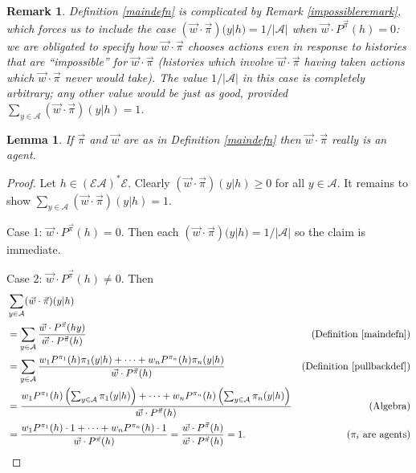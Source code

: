 \documentclass[twoside]{article}
\newtheorem{remark}[theorem]{Remark}
\newtheorem{lemma}[theorem]{Lemma}
\begin{document}
\begin{remark}
    Definition \ref{maindefn} is complicated by Remark \ref{impossibleremark},
    which forces us to include the case
    $(\vec w\cdot\vec\pi)(y|h)=1/|\mathcal A|$ when
    $\vec w\cdot {P^{\vec\pi}}(h)=0$: we are obligated to specify how
    $\vec w\cdot\vec\pi$ chooses actions even in response to histories that
    are ``impossible'' for $\vec w\cdot\vec\pi$ (histories which involve
    $\vec w\cdot\vec\pi$ having taken actions which $\vec w\cdot\vec\pi$
    never would take). The value $1/|\mathcal A|$ in this case is completely arbitrary;
    any other value would be just as good,
    provided $\sum_{y\in\mathcal A}(\vec w\cdot\vec\pi)(y|h)=1$.
\end{remark}

\begin{lemma}
    If $\vec\pi$ and $\vec w$ are as in Definition \ref{maindefn}
    then $\vec w\cdot\vec\pi$ really is an agent.
\end{lemma}

\begin{proof}
    Let $h\in(\mathcal E\mathcal A)^*\mathcal E$.
    Clearly $(\vec w\cdot\vec\pi)(y|h)\geq 0$ for all $y\in\mathcal A$.
    It remains to show
    $\sum_{y\in\mathcal A}(\vec w\cdot\vec\pi)(y|h)=1$.

    Case 1: $\vec w\cdot {P^{\vec\pi}}(h)=0$. Then
    each $(\vec w\cdot\vec\pi)(y|h)=1/|\mathcal A|$ so the
    claim is immediate.

    Case 2: $\vec w\cdot {P^{\vec\pi}}(h)\not=0$. Then
    \begin{align*}
        &{} \sum_{y\in\mathcal A}(\vec w\cdot\vec\pi)(y|h)\\
            &= \sum_{y\in\mathcal A}
                \frac{\vec w\cdot {P^{\vec\pi}}(hy)}{\vec w\cdot {P^{\vec\pi}}(h)}
                &\mbox{(Definition \ref{maindefn})}\\
            &= \sum_{y\in\mathcal A}
                \frac
                {w_1 P^{\pi_1}(h)\pi_1(y|h)+\cdots+w_n P^{\pi_n}(h)\pi_n(y|h)}
                {\vec w\cdot {P^{\vec\pi}}(h)}
                &\mbox{(Definition \ref{pullbackdef})}\\
            &= \frac{
                w_1 P^{\pi_1}(h)\left(\mbox{$\sum_{y\in\mathcal A}\pi_1(y|h)$}\right)
                +\cdots+
                w_n P^{\pi_n}(h)\left(\mbox{$\sum_{y\in\mathcal A}\pi_n(y|h)$}\right)
                }
                {\vec w\cdot {P^{\vec\pi}}(h)}
                &\mbox{(Algebra)}\\
            &= \frac
                {w_1 P^{\pi_1}(h)\cdot 1 + \cdots + w_n P^{\pi_n}(h)\cdot1}
                {\vec w\cdot {P^{\vec\pi}}(h)}
                =\frac{\vec w\cdot {P^{\vec\pi}}(h)}{\vec w\cdot {P^{\vec\pi}}(h)}=1.
                &\mbox{($\pi_i$ are agents)}
    \end{align*}
\end{proof}
\end{document}
